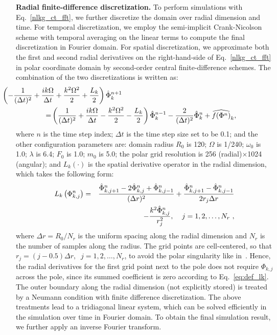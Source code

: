 \documentclass[10pt,journal,compsoc,twoside]{IEEEtran}
\newcommand{\bl}[1]{{\color{black}{#1}}}
\begin{document}
	\vspace{0.15cm}
	\noindent
	\textbf{Radial finite-difference discretization.}
	To perform simulations with Eq.~\ref{nlkg_ct_fft}, we further discretize the domain over radial dimension and time.
	For temporal discretization, we employ the semi-implicit Crank-Nicolson scheme\bl{\cite{Anderson_95}} with temporal averaging on the linear terms to compute the final discretization in Fourier domain.
	For spatial discretization, we approximate both the first and second radial derivatives on the right-hand-side of Eq.~\ref{nlkg_ct_fft} in polar coordinate domain by second-order central finite-difference schemes.
	The combination of the two discretizations is written as:
	\begin{eqnarray}
		& \hspace*{-24.5mm} \left(-\frac{1}{(\Delta t)^2}+\frac{ik\Omega}{\Delta t}+\frac{k^2\Omega^2}{2}+\frac{L_k}{2} \right) \hat{\Phi}_k^{n+1} \cr
		= & \left(\frac{1}{(\Delta t)^2}+\frac{ik\Omega}{\Delta t}-\frac{k^2\Omega^2}{2}-\frac{L_k}{2} \right) \hat{\Phi}_k^{n-1}
		-\frac{2}{(\Delta t)^2} \hat{\Phi}_k^n + \widehat{f(\Phi^n)}_k,
		\label{eq:2d_simu}
	\end{eqnarray}
	where $n$ is the time step index;
	$\Delta t$ is the time step size set to be 0.1;
	and the other configuration parameters are:
	domain radius $R_0$ is 120;
	$\Omega$ is 1/240;
	$\omega_0$ is 1.0;
	$\lambda$ is 6.4;
	$F_0$ is 1.0;
	$m_0$ is 5.0;
	the polar grid resolution is 256 (radial)$\times$1024 (angular);
	and $L_k(\cdot)$ is the spatial derivative operator in the radial dimension, which takes the following form:
	\begin{eqnarray} \label{eq:def_lk}
		L_k \left(\Phi_{k,j}^n\right) &=& \frac{\hat{\Phi}_{k,j+1}^n-2\hat{\Phi}_{k,j}^n+\hat{\Phi}_{k,j-1}^n}{(\Delta r)^2} 
		+ \frac{\hat{\Phi}_{k,j+1}^n-\hat{\Phi}_{k,j-1}^n}{2 r_j \Delta r} \cr
		&~& - \frac{k^2 \hat{\Phi}_{k,j}^n}{r_j^2}, \;\;\;\; j=1,2,\dots,N_r \ ,
	\end{eqnarray}
	where $\Delta r$$=$$R_0 / N_r$ is the uniform spacing along the radial dimension and $N_r$ is the number of samples along the radius.
	The grid points are cell-centered, so that $r_j = (j - 0.5) \Delta r, \;\; j=1,2,\dots,N_r$, to avoid the polar singularity like in~\cite{Mohseni_JCP_00}.
	Hence, the radial derivatives for the first grid point next to the pole does not require $\Phi_{k,j}$ across the pole, since its summed coefficient is zero according to Eq.~\ref{eq:def_lk}.
	The outer boundary along the radial dimension (not explicitly stored) is treated by a Neumann condition with finite difference discretization.
	The above treatments lead to a tridiagonal linear system, which can be solved efficiently in the simulation over time in Fourier domain.
	To obtain the final simulation result, we further apply an inverse Fourier transform.
	
\end{document}
